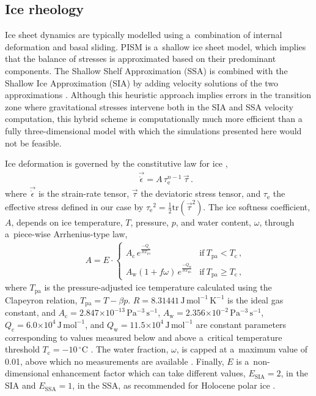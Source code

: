 \documentclass{article}
\newcommand{\e}[1]{\ensuremath{\times 10^{#1}}}
\newcommand{\unit}[1]{\ensuremath{\mathrm{#1}}}
\newcommand{\degree}[0]{\ensuremath{^{\circ}}}
\begin{document}
\subsection{Ice rheology}
\label{sec:icedyn}

    Ice sheet dynamics are typically modelled using a~combination of internal
    deformation and basal sliding. PISM is a~shallow ice sheet model, which
    implies that the balance of stresses is approximated based on their
    predominant components. The Shallow Shelf Approximation (SSA) is combined
    with the Shallow Ice Approximation (SIA) by adding velocity solutions of
    the two approximations \citep[Eqs.~7--9 and 15]{Winkelmann.etal.2011}.
    Although this heuristic approach implies errors in the transition zone
    where gravitational stresses intervene both in the SIA and SSA velocity
    computation, this hybrid scheme is computationally much more efficient than
    a fully three-dimensional model with which the simulations presented here
    would not be feasible.

    Ice deformation is governed by the constitutive law for ice
    \citep{Glen.1952, Nye.1953},
%
\begin{align}
&\label{eqn:glenslaw}
&\vec{\dot{\epsilon}} = A\,\tau_{\mathrm{e}}^{n-1}\,\vec{\tau} \,.
\end{align}
%
    where $\vec{\dot{\epsilon}}$ is the strain-rate tensor, $\vec{\tau}$ the
    deviatoric stress tensor, and $\tau_{\mathrm{e}}$ the effective stress
    defined in our case by
    ${\tau_{\mathrm{e}}}^2=\frac{1}{2}\mathrm{tr}(\vec{\tau}^2)$. The ice
    softness coefficient, $A$, depends on ice temperature, $T$, pressure, $p$,
    and water content, $\omega$, through a~piece-wise Arrhenius-type law,
%
\begin{align}
&\label{eqn:softness}
&A = E\cdot
\begin{cases}
A_{\mathrm{c}} \,e^\frac{-Q_{\mathrm{c}}}{RT_{\text{pa}}}            & \text{if}\ T_{\text{pa}}  <  T_{\mathrm{c}} \,, \\
A_{\mathrm{w}} (1+f\omega)\,e^\frac{-Q_{\mathrm{w}}}{RT_{\text{pa}}} & \text{if}\ T_{\text{pa}} \ge T_{\mathrm{c}} \,,
\end{cases}
\end{align}
%
    where $T_{\text{pa}}$ is the pressure-adjusted ice temperature calculated
    using the Clapeyron relation, $T_{\text{pa}}=T-{\beta}p$.
    $R=8.31441$\,\unit{J\,mol^{-1}\,K^{-1}} is the ideal gas constant, and
    $A_{\mathrm{c}}=2.847\e{-13}$\,\unit{Pa^{-3}\,s^{-1}},
    $A_{\mathrm{w}}=2.356\e{-2}$\,\unit{Pa^{-3}\,s^{-1}},
    $Q_{\mathrm{c}}=6.0\e4$\,\unit{J\,mol^{-1}}, and
    $Q_{\mathrm{w}}=11.5\e4$\,\unit{J\,mol^{-1}} are constant parameters
    corresponding to values measured below and above a~critical temperature
    threshold $T_{\mathrm{c}}=-10$\,\unit{{\degree}C}
    \citep[p.~72]{Cuffey.Paterson.2010}. The water fraction, $\omega$, is
    capped at a~maximum value of 0.01, above which no measurements are
    available \citep[Eq.~5.7]{Lliboutry.Duval.1985, Greve.1997}. Finally, $E$
    is a~non-dimensional enhancement factor which can take different values,
    $E_{\text{SIA}}=2$, in the SIA and $E_{\text{SSA}}=1$, in the SSA, as
    recommended for Holocene polar ice \citep[p.~77]{Cuffey.Paterson.2010}.
\end{document}
